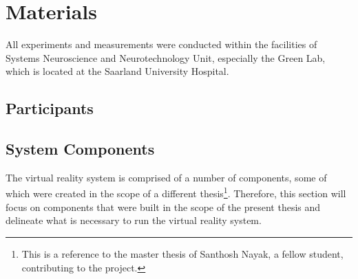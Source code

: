 
\section{Materials}
All experiments and measurements were conducted within the facilities of Systems Neuroscience and Neurotechnology Unit, especially the Green Lab, which is located at the Saarland University Hospital. 

\subsection{Participants}

\subsection{System Components}
The virtual reality system is comprised of a number of components, some of which were created in the scope of a different thesis\footnote{This is a reference to the master thesis of Santhosh Nayak, a fellow student, contributing to the project.}. Therefore, this section will focus on components that were built in the scope of the present thesis and delineate what is necessary to run the virtual reality system.
  
